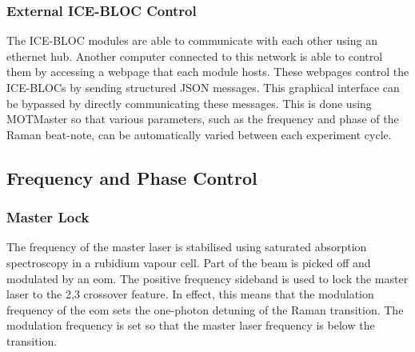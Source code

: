 \subsubsection{External ICE-BLOC Control}
The ICE-BLOC modules are able to communicate with each other using an ethernet
hub. Another computer connected to this network is able to control them by
accessing a webpage that each module hosts. These webpages control the ICE-BLOCs
by sending structured JSON messages. This graphical interface can be bypassed by
directly communicating these messages. This is done using MOTMaster so that
various parameters, such as the frequency and phase of the Raman beat-note, can
be automatically varied between each experiment cycle. \subsection{Frequency and
Phase Control}\label{subsec:msquared_control}

\subsubsection{Master Lock}
The frequency of the master laser is stabilised using saturated absorption
spectroscopy in a rubidium vapour cell. Part of the beam is picked off and
modulated by an \ac{eom}. The positive frequency sideband is used to lock the
master laser to the 2,3 crossover feature. In effect, this means that the
modulation frequency of the \ac{eom} sets the one-photon detuning of the Raman
transition. The modulation frequency is set so that the master laser frequency
is  below the  transition.


